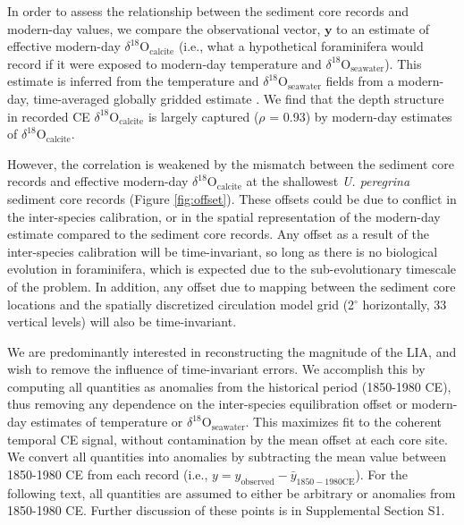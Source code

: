 \documentclass[draft]{agujournal2019}
\begin{document}
In order to assess the relationship between the sediment core records
  and modern-day values, we compare the
observational vector, $\mathbf{y}$ to an estimate of effective modern-day
$\delta^{18}\mathrm{O}_{\mathrm{calcite}}$ (i.e., what a hypothetical
foraminifera would record if it were exposed to 
modern-day temperature
and $\delta^{18}\mathrm{O}_{\mathrm{seawater}}$). This estimate is inferred
  from the temperature and $\delta^{18}\mathrm{O}_{\mathrm{seawater}}$ fields from a
  modern-day, time-averaged globally gridded estimate \cite{gebbie2010}.
We find that the depth
structure in recorded CE $\delta^{18}\mathrm{O}_{\mathrm{calcite}}$ is
largely captured ($\rho$ = 0.93) by modern-day estimates of
$\delta^{18}\mathrm{O}_{\mathrm{calcite}}$.

However, the correlation is weakened by the mismatch between the sediment core records and effective modern-day $\delta^{18}\mathrm{O}_{\mathrm{calcite}}$ at the shallowest \textit{U. peregrina} sediment
  core records
(Figure \ref{fig:offset}).
These offsets could be due to
  conflict in the inter-species calibration, or in the
  spatial representation of the modern-day estimate compared to the
  sediment core records. Any offset as a result of the inter-species calibration will be
  time-invariant, so long as there is no biological evolution in foraminifera, which is expected due to the sub-evolutionary timescale of the problem. In addition, any offset due to mapping between the sediment core locations and the spatially discretized circulation model grid (2$^{\circ}$ horizontally, 33 vertical levels) will also be time-invariant.

We are predominantly interested in reconstructing the magnitude of the LIA,
  and wish to remove the influence of time-invariant errors. We accomplish this by
  computing all quantities as anomalies from the historical period (1850-1980 CE),
  thus removing
  any dependence on the inter-species equilibration offset or modern-day estimates of
  temperature or $\delta^{18}\mathrm{O}_{\mathrm{seawater}}$. 
This maximizes fit to the coherent temporal CE
signal, without contamination by the mean offset at each core site.
 We convert all quantities into anomalies by subtracting the mean value
between 1850-1980 CE from each record (i.e., $y = y_{\mathrm{observed}} - \bar{y}_{\mathrm{1850-1980 CE}}$). For the following text, all quantities are assumed to either be arbitrary or anomalies from 1850-1980 CE. Further discussion of these points is in Supplemental Section S1.
\end{document}

